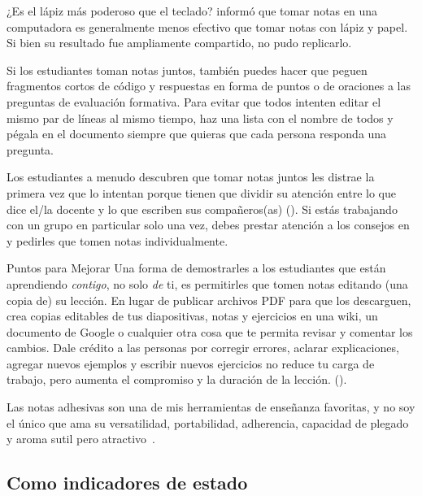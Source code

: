 \begin{aside}{¿Es el lápiz más poderoso que el teclado?}
  \cite{Muel2014} informó que tomar notas en una computadora
  es generalmente menos efectivo que tomar notas con lápiz y papel.
  Si bien su resultado fue ampliamente compartido,
  \cite{More2019} no pudo replicarlo.
\end{aside}

Si los estudiantes toman notas juntos,
también puedes hacer que peguen fragmentos cortos de código
y respuestas en forma de puntos o de oraciones a las preguntas de evaluación formativa.
Para evitar que todos intenten editar el mismo par de líneas al mismo tiempo,
haz una lista con el nombre de todos y pégala en el documento
siempre que quieras que cada persona responda una pregunta.

Los estudiantes a menudo descubren que tomar notas juntos les distrae
la primera vez que lo intentan porque tienen que dividir su atención entre
lo que dice el/la docente
y lo que escriben sus compañeros(as) ().
Si estás trabajando con un grupo en particular solo una vez,
debes prestar atención a los consejos en 
y pedirles que tomen notas individualmente.

\begin{aside}{Puntos para Mejorar}
  Una forma de demostrarles a los estudiantes que están aprendiendo \emph{contigo},
  no solo \emph{de} ti,
  es permitirles que tomen notas editando (una copia de) su lección.
  En lugar de publicar archivos PDF para que los descarguen,
  crea copias editables de tus diapositivas, notas y ejercicios
  en una wiki,
  un documento de Google
  o cualquier otra cosa que te permita revisar y comentar los cambios.
  Dale crédito a las personas por corregir errores,
  aclarar explicaciones,
  agregar nuevos ejemplos
  y escribir nuevos ejercicios no reduce tu carga de trabajo,
  pero aumenta el compromiso y la duración de la lección.
  ().
\end{aside}


Las notas adhesivas son una de mis herramientas de enseñanza favoritas,
y no soy el único que ama su versatilidad,
portabilidad, adherencia, capacidad de plegado
y aroma sutil pero atractivo~\cite{Ward2015}.

\subsection*{Como indicadores de estado}

